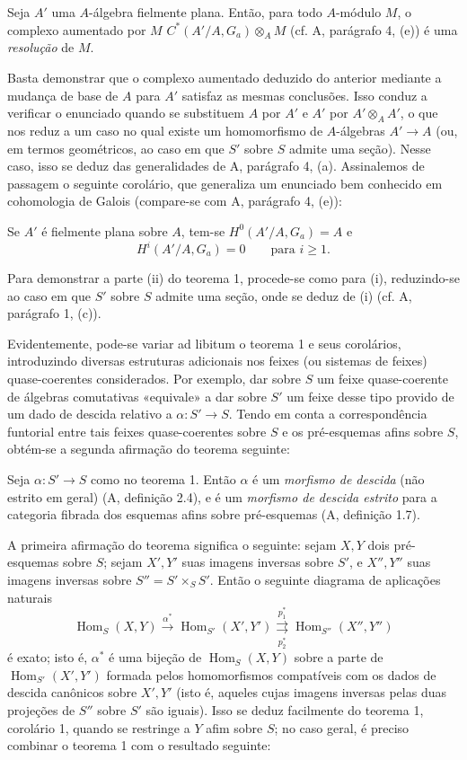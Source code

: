  Seja $A'$ uma $A$-álgebra fielmente plana. Então, para
todo $A$-módulo $M$, o complexo aumentado por $M$
$C^*(A'/A,G_a)\otimes_A M$ (cf. A, parágrafo 4, (e)) é uma
\emph{resolução} de $M$.

Basta demonstrar que o complexo aumentado deduzido do anterior mediante a
mudança de base de $A$ para $A'$ satisfaz as mesmas conclusões. Isso conduz a
verificar o enunciado quando se substituem $A$ por $A'$ e $A'$ por
$A'\otimes_AA'$, o que nos reduz a um caso no qual existe um
homomorfismo de $A$-álgebras $A'\longrightarrow A$ (ou, em termos
geométricos, ao caso em que $S'$ sobre $S$ admite uma seção). Nesse caso,
isso se deduz das generalidades de A, parágrafo 4, (a). Assinalemos de passagem
o seguinte corolário, que generaliza um enunciado bem conhecido em
cohomologia de Galois (compare-se com A, parágrafo 4, (e)):

 Se $A'$ é fielmente plana sobre $A$, tem-se
$H^0(A'/A,G_a)=A$ e
\[
  H^i(A'/A,G_a)=0\qquad\text{para $i\geq1$}.
\]

Para demonstrar a parte (ii) do teorema 1, procede-se como para (i),
reduzindo-se ao caso em que $S'$ sobre $S$ admite uma seção, onde se deduz
de (i) (cf. A, parágrafo 1, (c)).

Evidentemente, pode-se variar ad libitum o teorema 1 e seus corolários,
introduzindo diversas estruturas adicionais nos feixes (ou sistemas de
feixes) quase-coerentes considerados. Por exemplo, dar sobre $S$ um feixe
quase-coerente de álgebras comutativas «equivale» a dar sobre $S'$ um feixe desse
tipo provido de um dado de descida relativo a
$\alpha:S'\longrightarrow S$. Tendo em conta a correspondência funtorial
entre tais feixes quase-coerentes sobre $S$ e os pré-esquemas afins sobre
$S$, obtém-se a segunda afirmação do teorema seguinte:

 Seja $\alpha:S'\longrightarrow S$ como no teorema 1.
Então $\alpha$ é um \emph{morfismo de descida} (não estrito em geral)
(A, definição 2.4), e é um \emph{morfismo de descida estrito} para a
categoria fibrada dos esquemas afins sobre pré-esquemas
(A, definição 1.7).

A primeira afirmação do teorema significa o seguinte: sejam $X,Y$ dois
pré-esquemas sobre $S$; sejam $X',Y'$ suas imagens inversas sobre $S'$, e
$X'',Y''$ suas imagens inversas sobre $S''=S'\times_SS'$. Então o seguinte
diagrama de aplicações naturais
\[
  \operatorname{Hom}_S(X,Y)\xrightarrow{\alpha^*}
  \operatorname{Hom}_{S'}(X',Y')
  \underset{p_2^*}{\overset{p_1^*}{\rightrightarrows}}
  \operatorname{Hom}_{S''}(X'',Y'')
\]
é exato; isto é, $\alpha^*$ é uma bijeção de
$\operatorname{Hom}_S(X,Y)$ sobre a parte de
$\operatorname{Hom}_{S'}(X',Y')$ formada pelos homomorfismos compatíveis com
os dados de descida canônicos sobre $X',Y'$ (isto é, aqueles cujas
imagens inversas pelas duas projeções de $S''$ sobre $S'$ são iguais).
Isso se deduz facilmente do teorema 1, corolário 1, quando se restringe
a $Y$ afim sobre $S$; no caso geral, é preciso combinar o teorema 1 com o
resultado seguinte:

